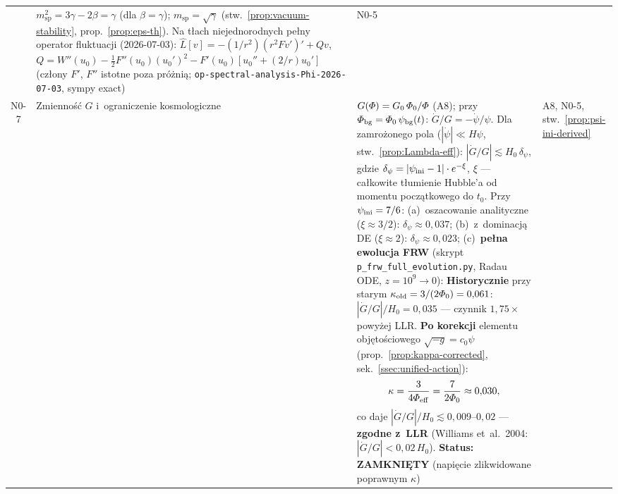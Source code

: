 \begin{center}
\begin{tabular}{@{}clp{7.5cm}l@{}}
  & $m_{\mathrm{sp}}^2 = 3\gamma - 2\beta = \gamma$
    (dla $\beta = \gamma$);
    $m_{\mathrm{sp}} = \sqrt{\gamma}$
    (stw.~\ref{prop:vacuum-stability}, prop.~\ref{prop:eps-th}).
    Na t\l{}ach niejednorodnych pe\l{}ny operator fluktuacji
    (2026-07-03): $\hat{L}[v]=-(1/r^2)(r^2 F v')'+Qv$,
    $Q = W''(u_0) - \tfrac12 F''(u_0)(u_0')^2
       - F'(u_0)[u_0'' + (2/r)u_0']$
    (cz\l{}ony $F'$, $F''$ istotne poza pr\'o\.zni\k{a};
    \texttt{op-spectral-analysis-Phi-2026-07-03}, sympy exact)
  & N0-5 \\[4pt]
N0-7
  & Zmienno\'s\'c $G$ i~ograniczenie kosmologiczne
  & $G(\Phi) = G_0\,\PhiZero/\Phi$ (A8);
    przy $\Phi_{\mathrm{bg}} = \PhiZero\,\psi_{\mathrm{bg}}(t)$:
    $\dot{G}/G = -\dot\psi/\psi$.
    Dla zamro\.zonego pola ($|\dot\psi| \ll H\psi$, stw.~\ref{prop:Lambda-eff}):
    $|\dot{G}/G| \lesssim H_0\,\delta_\psi$,
    gdzie $\delta_\psi = |\psi_{\rm ini} - 1|\cdot e^{-\xi}$,
    $\xi$ --- ca\l{}kowite t\l{}umienie Hubble'a
    od momentu pocz\k{a}tkowego do $t_0$.
    Przy $\psi_{\rm ini} = 7/6$:
    (a)~oszacowanie analityczne ($\xi \approx 3/2$):
    $\delta_\psi \approx 0{,}037$;
    (b)~z~dominacj\k{a} DE ($\xi \approx 2$):
    $\delta_\psi \approx 0{,}023$;
    (c)~\textbf{pe\l{}na ewolucja FRW} (skrypt \texttt{p\_frw\_full\_evolution.py},
    Radau ODE, $z = 10^9 \to 0$):
    \textbf{Historycznie} przy starym $\kappa_{\rm old} = 3/(2\Phi_0) = 0{,}061$:
    $|\dot{G}/G|/H_0 = 0{,}035$ --- czynnik $1{,}75\times$ powy\.zej LLR.
    \textbf{Po korekcji} elementu obj\k{e}to\'sciowego
    $\sqrt{-g} = c_0\psi$ (prop.~\ref{prop:kappa-corrected},
    sek.~\ref{ssec:unified-action}):
    \begin{equation*}
      \kappa = \frac{3}{4\Phi_{\rm eff}} = \frac{7}{2\PhiZero} \approx 0{,}030,
    \end{equation*}
    co daje $|\dot{G}/G|/H_0 \lesssim 0{,}009$--$0{,}02$
    --- \textbf{zgodne z~LLR} (Williams et~al.\ 2004:
    $|\dot{G}/G| < 0{,}02\,H_0$).
    \textbf{Status: ZAMKNI\k{E}TY} (napi\k{e}cie zlikwidowane
    poprawnym $\kappa$)
  & A8, N0-5, stw.~\ref{prop:psi-ini-derived} \\
\bottomrule
\end{tabular}
\end{center}

